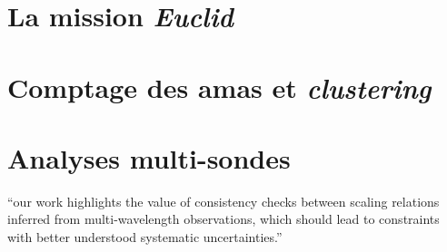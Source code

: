 %
%

{\color{vert}\lipsum[2-3]}

\section{La mission \emph{Euclid}}
{\color{vert}\lipsum[2-5]}

\section{Comptage des amas et \emph{clustering}}
{\color{vert}\lipsum[2-5]}

\section{Analyses multi-sondes}

``our work highlights the value of consistency checks between scaling
relations inferred from multi-wavelength observations, which should
lead to constraints with better understood systematic uncertainties.''~\citep{Bleem2019} 


{\color{vert}\lipsum[2-5]}
